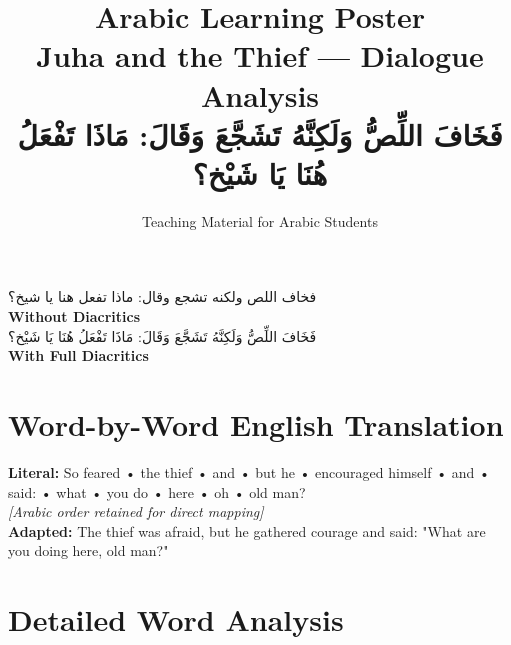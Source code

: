 \documentclass[a4paper,12pt]{article}
\begin{document}
\title{\textbf{\Large Arabic Learning Poster}\\
\large Juha and the Thief — Dialogue Analysis\\
\normalsize \textarabic{فَخَافَ اللِّصُّ وَلَكِنَّهُ تَشَجَّعَ وَقَالَ: مَاذَا تَفْعَلُ هُنَا يَا شَيْخ؟}}
\author{Teaching Material for Arabic Students}
\date{}
\maketitle

\begin{tcolorbox}[colback=boxcolor,colframe=headercolor,title=\textbf{Arabic Text Analysis}]
\centering
\textarabic{فخاف اللص ولكنه تشجع وقال: ماذا تفعل هنا يا شيخ؟}
\\[0.5em]
\textbf{Without Diacritics}
\\[1em]
\textarabic{فَخَافَ اللِّصُّ وَلَكِنَّهُ تَشَجَّعَ وَقَالَ: مَاذَا تَفْعَلُ هُنَا يَا شَيْخ؟}
\\[0.5em]
\textbf{With Full Diacritics}
\end{tcolorbox}

\section{Word-by-Word English Translation}
\begin{tcolorbox}[colback=white,colframe=accentcolor]
\textbf{Literal:} So feared • the thief • and • but he • encouraged himself • and • said: • what • you do • here • oh • old man? \\
\textit{[Arabic order retained for direct mapping]}\\[0.5em]
\textbf{Adapted:} The thief was afraid, but he gathered courage and said: "What are you doing here, old man?"
\end{tcolorbox}

\section{Detailed Word Analysis}
\end{document}
